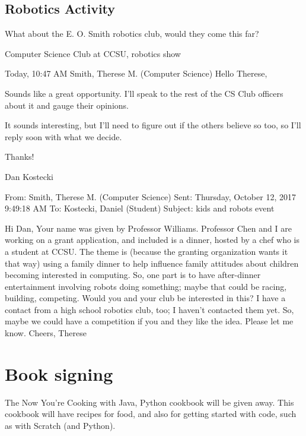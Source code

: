 \documentclass[]{article}
\begin{document}
\subsection{Robotics Activity}
What about the E. O. Smith robotics club, would they come this far?


Computer Science Club at CCSU, robotics show

Today, 10:47 AM
Smith, Therese M. (Computer Science) 
Hello Therese, 

Sounds like a great opportunity. I'll speak to the rest of the CS Club officers about it and gauge their opinions.

It sounds interesting, but I'll need to figure out if the others believe so too, so I'll reply soon with what we decide.

Thanks!

Dan Kostecki

From: Smith, Therese M. (Computer Science)
Sent: Thursday, October 12, 2017 9:49:18 AM
To: Kostecki, Daniel (Student)
Subject: kids and robots event

Hi Dan,
Your name was given by Professor Williams.
Professor Chen and I are working on a grant application, and included is a dinner, hosted by a chef who is a student at CCSU. The theme is (because the granting organization wants it that way) using a family dinner to help influence family attitudes about children becoming interested in computing. So, one part is to have after-dinner entertainment involving robots doing something; maybe that could be racing, building, competing. Would you and your club be interested in this? 
I have a contact from a high school robotics club, too; I haven't contacted them yet. So, maybe we could have a competition if you and they like the idea. Please let me know.
Cheers,
Therese

\section{Book signing}
The Now You're Cooking with Java, Python cookbook will be given away. This cookbook will have recipes for food, and also for getting started with code, such as with Scratch (and Python).
\end{document}
